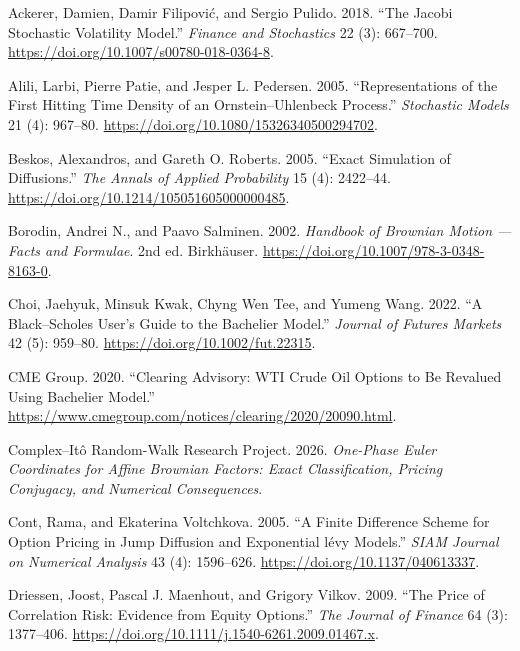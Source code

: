 \documentclass[
  english,
  10pt,
  letterpaper,
  DIV=11,
  numbers=noendperiod]{scrartcl}
\newlength{\cslhangindent}
\newenvironment{CSLReferences}[2] %
 {\begin{list}{}{%
  \setlength{\itemindent}{0pt}
  \setlength{\leftmargin}{0pt}
  \setlength{\parsep}{0pt}
  \ifodd #1
   \setlength{\leftmargin}{\cslhangindent}
   \setlength{\itemindent}{-1\cslhangindent}
  \fi
  \setlength{\itemsep}{#2\baselineskip}}}
 {\end{list}}
\theoremstyle{plain}
\theoremstyle{plain}
\theoremstyle{plain}
\theoremstyle{plain}
\theoremstyle{definition}
\theoremstyle{remark}
\begin{document}
\protect{}\label{refs}
\begin{CSLReferences}{1}{1}
Ackerer, Damien, Damir Filipović, and Sergio Pulido. 2018. {``The Jacobi
Stochastic Volatility Model.''} \emph{Finance and Stochastics} 22 (3):
667--700. \url{https://doi.org/10.1007/s00780-018-0364-8}.

Alili, Larbi, Pierre Patie, and Jesper L. Pedersen. 2005.
{``Representations of the First Hitting Time Density of an
{Ornstein--Uhlenbeck} Process.''} \emph{Stochastic Models} 21 (4):
967--80. \url{https://doi.org/10.1080/15326340500294702}.

Beskos, Alexandros, and Gareth O. Roberts. 2005. {``Exact Simulation of
Diffusions.''} \emph{The Annals of Applied Probability} 15 (4):
2422--44. \url{https://doi.org/10.1214/105051605000000485}.

Borodin, Andrei N., and Paavo Salminen. 2002. \emph{Handbook of
{Brownian} Motion --- Facts and Formulae}. 2nd ed. Birkh{ä}user.
\url{https://doi.org/10.1007/978-3-0348-8163-0}.

Choi, Jaehyuk, Minsuk Kwak, Chyng Wen Tee, and Yumeng Wang. 2022. {``A
{Black--Scholes} User's Guide to the {Bachelier} Model.''} \emph{Journal
of Futures Markets} 42 (5): 959--80.
\url{https://doi.org/10.1002/fut.22315}.

CME Group. 2020. {``Clearing Advisory: {WTI} Crude Oil Options to Be
Revalued Using Bachelier Model.''}
\url{https://www.cmegroup.com/notices/clearing/2020/20090.html}.

Complex--Itô Random-Walk Research Project. 2026. \emph{One-Phase {Euler}
Coordinates for Affine {Brownian} Factors: Exact Classification, Pricing
Conjugacy, and Numerical Consequences}.

Cont, Rama, and Ekaterina Voltchkova. 2005. {``A Finite Difference
Scheme for Option Pricing in Jump Diffusion and Exponential l{é}vy
Models.''} \emph{SIAM Journal on Numerical Analysis} 43 (4): 1596--626.
\url{https://doi.org/10.1137/040613337}.

Driessen, Joost, Pascal J. Maenhout, and Grigory Vilkov. 2009. {``The
Price of Correlation Risk: Evidence from Equity Options.''} \emph{The
Journal of Finance} 64 (3): 1377--406.
\url{https://doi.org/10.1111/j.1540-6261.2009.01467.x}.


\end{CSLReferences}
\end{document}
